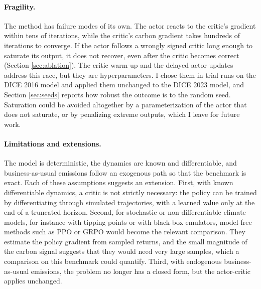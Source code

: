 \paragraph{Fragility.} The method has failure modes of its own. The actor reacts to the critic's gradient within tens of iterations, while the critic's carbon gradient takes hundreds of iterations to converge. If the actor follows a wrongly signed critic long enough to saturate its output, it does not recover, even after the critic becomes correct (Section \ref{sec:ablation}). The critic warm-up and the delayed actor updates address this race, but they are hyperparameters. I chose them in trial runs on the DICE 2016 model and applied them unchanged to the DICE 2023 model, and Section \ref{sec:seeds} reports how robust the outcome is to the random seed. Saturation could be avoided altogether by a parameterization of the actor that does not saturate, or by penalizing extreme outputs, which I leave for future work.

\paragraph{Limitations and extensions.} The model is deterministic, the dynamics are known and differentiable, and business-as-usual emissions follow an exogenous path so that the benchmark is exact. Each of these assumptions suggests an extension. First, with known differentiable dynamics, a critic is not strictly necessary: the policy can be trained by differentiating through simulated trajectories, with a learned value only at the end of a truncated horizon. Second, for stochastic or non-differentiable climate models, for instance with tipping points or with black-box emulators, model-free methods such as PPO or GRPO would become the relevant comparison. They estimate the policy gradient from sampled returns, and the small magnitude of the carbon signal suggests that they would need very large samples, which a comparison on this benchmark could quantify. Third, with endogenous business-as-usual emissions, the problem no longer has a closed form, but the actor-critic applies unchanged.

